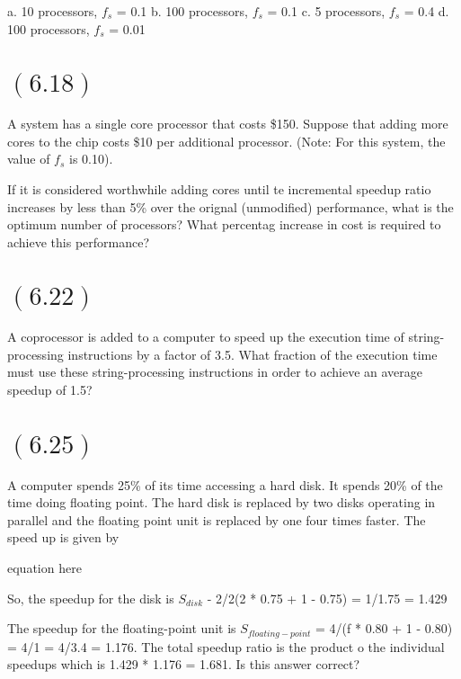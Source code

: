 \documentclass[letterpaper,12pt,titlepage]{article}
\begin{document}
a. 10 processors, $f_s$ = 0.1
b. 100 processors, $f_s$ = 0.1
c. 5 processors, $f_s$ = 0.4
d. 100 processors, $f_s$ = 0.01

\begin{mdframed}[style=MyFrame]
\end{mdframed}

\section*{$(6.18)$} A system has a single core processor that costs \$150. Suppose that adding more cores to the chip costs \$10 per additional processor. (Note: For this system, the value of $f_s$ is 0.10).

If it is considered worthwhile adding cores until te incremental speedup ratio increases by less than 5\% over the orignal (unmodified) performance, what is the optimum number of processors? What percentag increase in cost is required to achieve this performance?

\begin{mdframed}[style=MyFrame]
\end{mdframed}

\section*{$(6.22)$} A coprocessor is added to a computer to speed up the execution time of string-processing instructions by a factor of 3.5. What fraction of the execution time must use these string-processing instructions in order to achieve an average speedup of 1.5?

\begin{mdframed}[style=MyFrame]
\end{mdframed}

\section*{$(6.25)$} A computer spends 25\% of its time accessing a hard disk. It spends 20\% of the time doing floating point. The hard disk is replaced by two disks operating in parallel and the floating point unit is replaced by one four times faster. The speed up is given by

equation here

So, the speedup for the disk is $S_{disk}$ - 2/2(2 * 0.75 + 1 - 0.75) = 1/1.75 = 1.429

The speedup for the floating-point unit is $S_{floating-point}$ = 4/(f * 0.80 + 1 - 0.80) = 4/1 = 4/3.4 = 1.176. The total speedup ratio is the product o the individual speedups which is 1.429 * 1.176 = 1.681. Is this answer correct?
\end{document}
